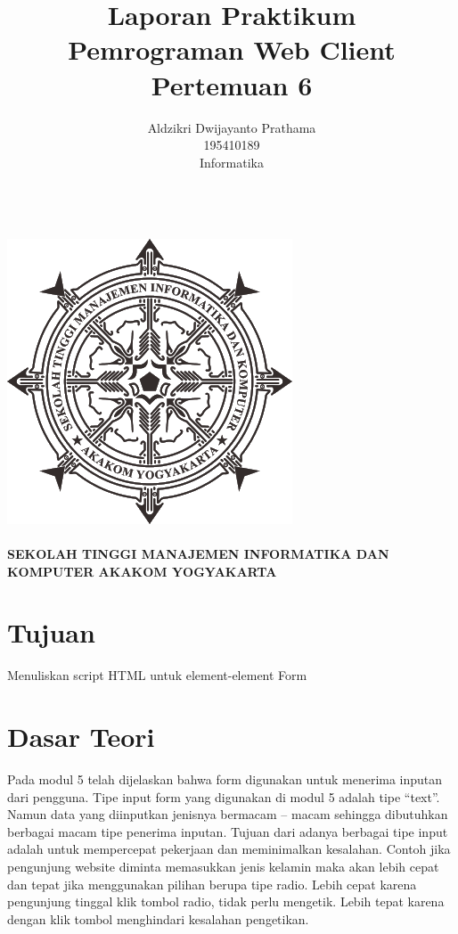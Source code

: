\documentclass[a4paper,12pt]{article}
\begin{document}
\title{ {\Large Laporan Praktikum}\\ Pemrograman Web Client\\{\Large Pertemuan 6}}

\author{Aldzikri Dwijayanto Prathama 
	\\195410189
	\\Informatika}
\makeatletter
\begin{titlepage}
	\begin{center}
		{\huge \bfseries \@title }\\[14ex]
		\includegraphics[scale=.8]{logo}\\[4ex]
		{\large \@author}\\[12ex]
		{\large \bfseries {SEKOLAH TINGGI MANAJEMEN INFORMATIKA DAN KOMPUTER
				AKAKOM YOGYAKARTA}}
	\end{center}


\end{titlepage}
\makeatother
\renewcommand{\figurename}{Gambar}
\newpage
\tableofcontents
\newpage
\section{Tujuan}
Menuliskan script HTML untuk element-element Form
\section{Dasar Teori}
Pada modul 5 telah dijelaskan bahwa form digunakan untuk menerima inputan dari
pengguna. Tipe input form yang digunakan di modul 5 adalah tipe “text”. Namun data
yang diinputkan jenisnya bermacam – macam sehingga dibutuhkan berbagai macam tipe
penerima inputan. Tujuan dari adanya berbagai tipe input adalah untuk mempercepat
pekerjaan dan meminimalkan kesalahan. Contoh jika pengunjung website diminta
memasukkan jenis kelamin maka akan lebih cepat dan tepat jika menggunakan pilihan
berupa tipe radio. Lebih cepat karena pengunjung tinggal klik tombol radio, tidak perlu
mengetik. Lebih tepat karena dengan klik tombol menghindari kesalahan pengetikan.\\
\end{document}
